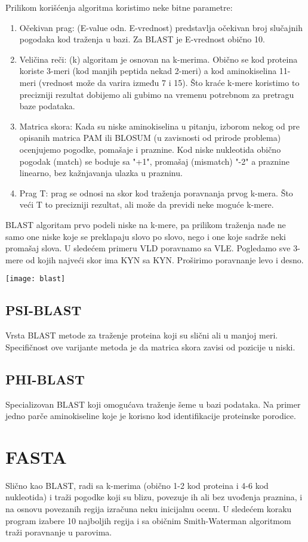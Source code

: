Prilikom korišćenja algoritma koristimo neke bitne parametre:

\begin{enumerate}
\item Očekivan prag: (E-value odn. E-vrednost) predstavlja očekivan broj slučajnih pogodaka kod traženja u bazi. Za BLAST je E-vrednost obično 10.
\item Veličina reči: (k) algoritam je osnovan na k-merima. Obično  se kod proteina koriste 3-meri (kod manjih peptida nekad 2-meri) a kod aminokiselina 11-meri (vrednost može da varira između 7 i 15). Što kraće k-mere koristimo to precizniji rezultat dobijemo ali gubimo na vremenu potrebnom za pretragu baze podataka.
\item Matrica skora: Kada su niske aminokiselina u pitanju, izborom nekog od pre opisanih matrica PAM ili BLOSUM (u zavisnosti od prirode problema) ocenjujemo pogodke, pomašaje i praznine. Kod niske nukleotida obično pogodak (match) se boduje sa "+1", promašaj (mismatch) "-2" a praznine linearno, bez kažnjavanja ulazka u prazninu.
\item Prag T: prag se odnosi na skor kod traženja poravnanja prvog k-mera. Što veći T to precizniji rezultat, ali može da previdi neke moguće k-mere.
\end{enumerate} \vspace{5mm}

BLAST algoritam prvo podeli niske na k-mere, pa prilikom traženja nađe ne samo one niske koje se preklapaju slovo po slovo, nego i one koje sadrže neki promašaj slova. 
U sledećem primeru VLD poravnamo sa VLE. Pogledamo sve 3-mere od kojih najveći skor ima KYN sa KYN. Proširimo poravnanje levo i desno.

\texttt{[image: blast]}

\subsection{PSI-BLAST}
Vrsta BLAST metode za traženje proteina koji su slični ali u manjoj meri. Specifičnost ove varijante metoda je da matrica skora zavisi od pozicije u niski.

\subsection{PHI-BLAST}
Specializovan BLAST koji omogućava traženje šeme u bazi podataka. Na primer jedno parče aminokiseline koje je korisno kod identifikacije proteinske porodice.

\section{FASTA}
Slično kao BLAST, radi sa k-merima (obično 1-2 kod proteina i 4-6 kod nukleotida) i traži pogodke koji su blizu, povezuje ih ali bez uvođenja praznina, i na osnovu povezanih regija izračuna neku inicijalnu ocenu. U sledećem koraku program izabere 10 najboljih regija i sa običnim Smith-Waterman algoritmom traži poravnanje u parovima.

